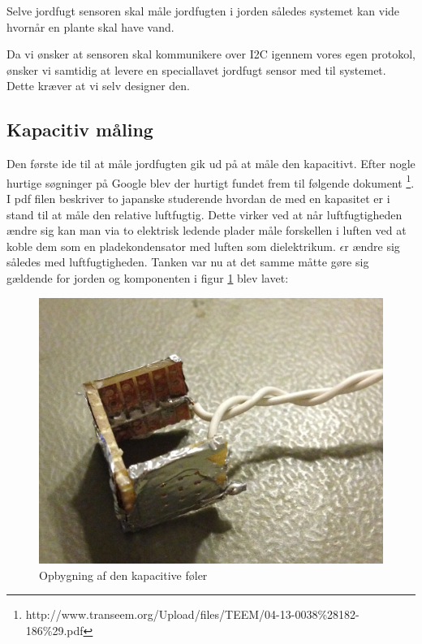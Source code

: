 Selve jordfugt sensoren skal måle jordfugten i jorden således systemet kan vide hvornår en plante skal have vand. 

Da vi ønsker at sensoren skal kommunikere over I2C igennem vores egen protokol, ønsker vi samtidig at levere en speciallavet jordfugt sensor med til systemet. Dette kræver at vi selv designer den. 

\subsection{Kapacitiv måling}
Den første ide til at måle jordfugten gik ud på at måle den kapacitivt. Efter nogle hurtige søgninger på Google blev der hurtigt fundet frem til følgende dokument
\footnote {http://www.transeem.org/Upload/files/TEEM/04-13-0038\%28182-186\%29.pdf}.
I pdf filen beskriver to japanske studerende hvordan de med en kapasitet er i stand til at måle den relative luftfugtig. Dette virker ved at når luftfugtigheden ændre sig kan man via to elektrisk ledende plader måle forskellen i luften ved at koble dem som en pladekondensator med luften som dielektrikum. 
$\epsilon$r ændre sig således med luftfugtigheden. Tanken var nu at det samme måtte gøre sig gældende for jorden og komponenten i figur \ref{photo:Kapsitiv_foeler} blev lavet:

\begin{figure}[H]
	\centering 
	\includegraphics[scale=0.1]{HardwareArkitektur/Sensore/Jordfugt_billeder/Kapacitiv_foler.JPG}
	\caption{Opbygning af den kapacitive f$\text{ø}$ler}
	\label{photo:Kapsitiv_foeler}
\end{figure}

